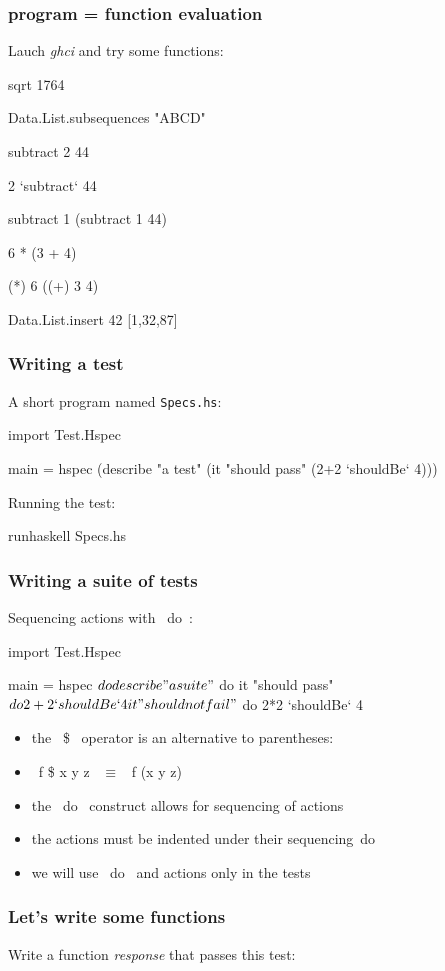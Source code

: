 \documentclass[11pt,xcolor={dvipsnames}]{beamer}
\newcommand{\tc}{\textcolor}
\newcommand{\key}[1]{\tc{orange}{#1}}
\newcommand{\rk}{\enskip{\key{$\hookleftarrow$}}}
\newcommand{\vs}{\vspace{1em}}
\begin{document}
\begin{frame}[fragile]
\frametitle{program = function evaluation}
Lauch \emph{ghci} and try some functions:
\begin{term}
sqrt 1764\rk

Data.List.subsequences "ABCD"\rk

subtract 2 44\rk

 2 `subtract` 44\rk

subtract 1 (subtract 1 44)\rk

6 * (3 + 4)\rk

(*) 6 ((+) 3 4)\rk

Data.List.insert 42 [1,32,87]\rk
\end{term}
\end{frame}
\begin{frame}[fragile]
\frametitle{Writing a test}

A short program named \texttt{Specs.hs}:
\begin{haskell}[frame=single,caption=Specs.hs]
import Test.Hspec

main = hspec 
(describe "a test" 
 (it "should pass" 
  (2+2  `shouldBe` 4)))
\end{haskell}
\vs
Running the test:
\begin{term}
runhaskell Specs.hs\rk
\end{term}
\end{frame}
\begin{frame}[fragile]
\frametitle{Writing a suite of tests}
Sequencing actions with ~do~:
\begin{haskell}

import Test.Hspec

main = hspec $ do
    describe "a suite" $ do
        it "should pass" $ do
            2+2  `shouldBe` 4
        it "should not fail" $ do
            2*2 `shouldBe` 4
\end{haskell}
\begin{itemize}
\item the ~\$~ operator is an alternative to parentheses:
\item ~f \$ x y z~ $\equiv$ ~f (x y z)~
\item the ~do~ construct allows for sequencing of actions
\item the actions must be indented under their sequencing~do~ 
\item we will use ~do~ and actions only in the tests
\end{itemize}
\end{frame}
\begin{frame}[fragile]
\frametitle{Let's write some functions}
Write a function \emph{response} that passes this test:
\end{frame}
\end{document}
